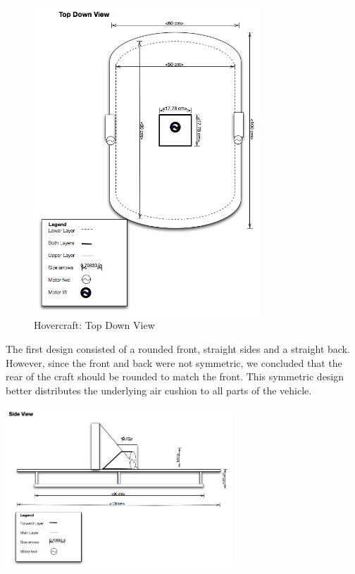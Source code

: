 \begin{figure}[h]
  \begin{center}
    \includegraphics[width=85mm]{imageSources/topDownView.png}
  \end{center}
  \caption{Hovercraft: Top Down View} 
  \label{topDownView}
\end{figure}

The first design consisted of a rounded front, straight sides and a straight back. However, since the front and back were not symmetric, we concluded that the rear of the craft should be rounded to match the front. This symmetric design better distributes the underlying air cushion to all parts of the vehicle.

  \begin{center}
    \includegraphics[width=85mm]{imageSources/sideView.png}
  \end{center}
  \caption{Hovercraft: Side View} 
  \label{sideView}

